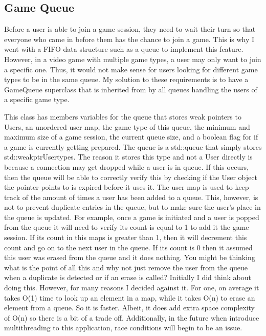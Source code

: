 \documentclass[conference]{IEEEtran}
\begin{document}
\subsection{Game Queue}
Before a user is able to join a game session, they need to wait their turn so that everyone who came in before them has the chance to join a game. 
This is why I went with a FIFO data structure such as a queue to implement this feature. 
However, in a video game with multiple game types, a user may only want to join a specific one.
Thus, it would not make sense for users looking for different game types to be in the same queue.
My solution to these requirements is to have a GameQueue superclass that is inherited from by all queues handling the users of a specific game type. \par
This class has members variables for the queue that stores weak pointers to Users, an unordered user map, the game type of this queue, the minimum and maximum size of a game session, the current queue size, and a boolean flag for if a game is currently getting prepared.
The queue is a std::queue that simply stores std::weak\textunderscore ptr\textlangle User\textrangle types. The reason it stores this type and not a User directly is because a connection may get dropped while a user is in queue.
If this occurs, then the queue will be able to correctly verify this by checking if the User object the pointer points to is expired before it uses it.
The user map is used to keep track of the amount of times a user has been added to a queue.
This, however, is not to prevent duplicate entries in the queue, but to make sure the user’s place in the queue is updated.
For example, once a game is initiated and a user is popped from the queue it will need to verify its count is equal to 1 to add it the game session.
If its count in this maps is greater than 1, then it will decrement this count and go on to the next user in the queue.
If its count is 0 then it assumed this user was erased from the queue and it does nothing.
You might be thinking what is the point of all this and why not just remove the user from the queue when a duplicate is detected or if an erase is called?
Initially I did think about doing this.
However, for many reasons I decided against it.
For one, on average it takes O(1) time to look up an element in a map, while it takes O(n) to erase an element from a queue.
So it is faster.
Albeit, it does add extra space complexity of O(n) so there is a bit of a trade off.
Additionally, in the future when introduce multithreading to this application, race conditions will begin to be an issue.
\end{document}
